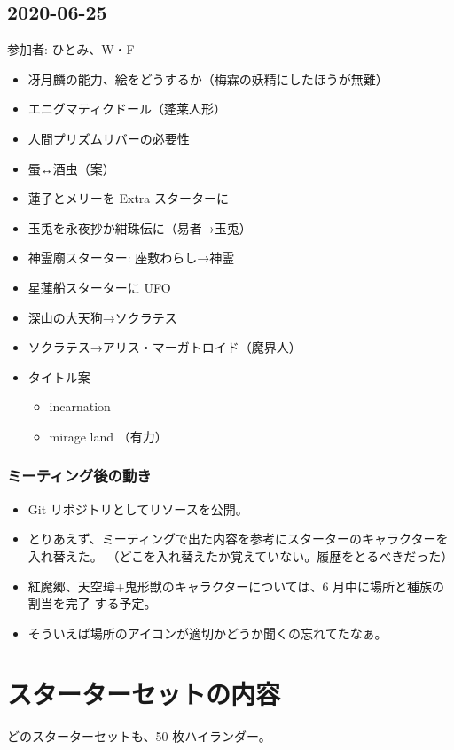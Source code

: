 \documentclass[line_length=22zw,number_of_lines=45,twocolumn]{jlreq}
\begin{document}
\subsection{2020-06-25}
参加者: ひとみ、W・F
\begin{itemize}
	\item 冴月麟の能力、絵をどうするか（梅霖の妖精にしたほうが無難）
	\item エニグマティクドール（蓬莱人形）
	\item 人間プリズムリバーの必要性
	\item 蜃↔酒虫（案）
	\item 蓮子とメリーを Extra スターターに
	\item 玉兎を永夜抄か紺珠伝に（易者→玉兎）
	\item 神霊廟スターター: 座敷わらし→神霊
	\item 星蓮船スターターに UFO
	\item 深山の大天狗→ソクラテス
	\item ソクラテス→アリス・マーガトロイド（魔界人）
	\item タイトル案
		\begin{itemize}
			\item incarnation
			\item mirage land （有力）
		\end{itemize}
\end{itemize}

\subsubsection*{ミーティング後の動き}
\begin{itemize}
	\item Git リポジトリとしてリソースを公開。
	\item とりあえず、ミーティングで出た内容を参考にスターターのキャラクターを入れ替えた。
		（どこを入れ替えたか覚えていない。履歴をとるべきだった）
	\item 紅魔郷、天空璋+鬼形獣のキャラクターについては、6 月中に場所と種族の割当を完了
		する予定。
	\item そういえば場所のアイコンが適切かどうか聞くの忘れてたなぁ。
\end{itemize}


\section{スターターセットの内容}
どのスターターセットも、50 枚ハイランダー。
\clearpage\small
\end{document}
